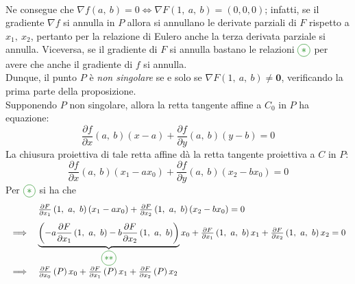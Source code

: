 \begin{demonstration}
\begin{gather*}
		\end{gather*}
	Ne consegue che $\nabla f\left(a,\ b\right)=0 \iff  \nabla F\left(1,\ a,\ b\right)=(0,0,0)$; infatti, se il gradiente $\nabla f$ si annulla in $P$ allora si annullano le derivate parziali di $F$ rispetto a $x_1,\ x_2$, pertanto per la relazione di Eulero anche la terza derivata parziale si annulla. Viceversa, se il gradiente di $F$ si annulla bastano le relazioni $\textcolor{green}{\circled{\ast}}$ per avere che anche il gradiente di $f$ si annulla.\\
	Dunque, il punto $P$ è \textit{non singolare} se e solo se $\nabla F\left(1,\ a,\ b\right)\neq \mathbf{0}$, verificando la prima parte della proposizione.\\
	Supponendo $P$ non singolare, allora la retta tangente affine a $C_0$ in $P$ ha equazione:
	\begin{equation*}
		\frac{\partial{f}}{\partial{x}}\left(a,\ b\right)(x-a) + \frac{\partial{f}}{\partial{y}}\left(a,\ b\right)(y-b)=0
	\end{equation*}
	La chiusura proiettiva di tale retta affine dà la retta tangente proiettiva a $C$ in $P$:
	\begin{equation*}
		\frac{\partial{f}}{\partial{x}}\left(a,\ b\right)(x_1-ax_0) + \frac{\partial{f}}{\partial{y}}\left(a,\ b\right)(x_2-bx_0)=0
	\end{equation*}
	Per $\textcolor{green}{\circled{\ast}}$ si ha che
		\begin{equation*}
			\begin{array}{ll}
				&\frac{\partial{F}}{\partial{x_1}}\left(1,\ a,\ b\right)(x_1-ax_0) + \frac{\partial{F}}{\partial{x_2}}\left(1,\ a,\ b\right)(x_2-bx_0)=0 \\[3mm]
				\implies & \underbrace{ \left( -a\frac{\partial{F}}{\partial{x_1}}\left(1,\ a,\ b\right) -b \frac{\partial{F}}{\partial{x_2}}\left(1,\ a,\ b\right) \right)}_{\textcolor{green}{\circled{\ast\ast}}}  x_0 + \frac{\partial{F}}{\partial{x_1}}\left(1,\ a,\ b\right) x_1 + \frac{\partial{F}}{\partial{x_2}}\left(1,\ a,\ b\right) x_2=0 \\
				\implies & \frac{\partial{F}}{\partial{x_0}}\left(P\right) x_0 + \frac{\partial{F}}{\partial{x_1}}\left(P\right) x_1 + \frac{\partial{F}}{\partial{x_2}}\left(P\right) x_2
			\end{array}
		\end{equation*}
\end{demonstration}

